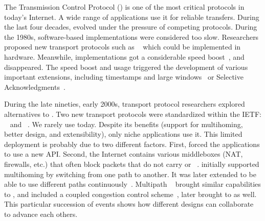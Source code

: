 The Transmission Control Protocol (\tcp) \cite{rfc793} is one of the most critical protocols in today's Internet. A wide range of applications use it for reliable transfers. During the last four decades, \tcp evolved under the pressure of competing protocols. During the 1980s, software-based \tcp implementations were considered too slow. Researchers proposed new transport protocols such as \xtp~\cite{sanders1990xpress} which could be implemented in hardware. Meanwhile, \tcp implementations got a considerable speed boost~\cite{clark1989analysis}, and \xtp disappeared. The \tcp speed boost and usage triggered the development of various important \tcp extensions, including timestamps and large windows~\cite{rfc1323} or Selective Acknowledgments~\cite{rfc2018}.

During the late nineties, early 2000s, transport protocol researchers
explored alternatives to \tcp. Two new transport protocols
were standardized within the IETF: \dccp~\cite{kohler2006designing} and
\sctp~\cite{rfc4960}. We rarely use \dccp today. Despite its benefits
(support for multihoming, better design, and extensibility), only niche
applications use it. This limited deployment is probably due to two different factors. First, \sctp forced the applications to use a new API. Second, the Internet contains various middleboxes (NAT, firewalls, etc.) that often block packets that do not carry \tcp or \udp~\cite{honda2011still}.
\sctp initially supported multihoming by switching from one path to another. It
was later extended to be able to use different paths continuously~\cite{iyengar2006concurrent}.  Multipath \tcp~\cite{rfc6824,raiciu2012hard} brought similar capabilities to \tcp, and included a coupled congestion control scheme~\cite{wischik2011design}, later brought to \sctp as well. This particular
succession of events shows how different designs can collaborate to advance each others.



